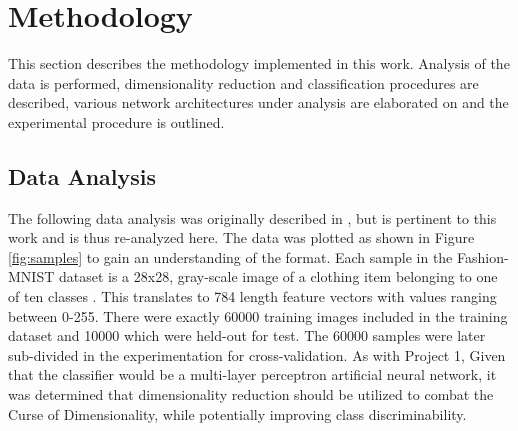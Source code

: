 \documentclass[conference]{IEEEtran}
\begin{document}
\section{Methodology} \label{Methodology}
	This section describes the methodology implemented in this work.  Analysis of the data is performed, dimensionality reduction  and classification procedures are described, various network architectures under analysis are elaborated on and the experimental procedure is outlined.

	\subsection{Data Analysis}
	 The following data analysis was originally described in \cite{McCurley2019PrincipeProject1}, but is pertinent to this work and is thus re-analyzed here.  The data was plotted as shown in Figure \ref{fig:samples} to gain an understanding of the format.  Each sample in the Fashion-MNIST dataset is a 28x28, gray-scale image of a clothing item belonging to one of ten classes \cite{Xiao2017FashionMNIST}. This translates to 784 length feature vectors with values ranging between 0-255. There were exactly 60000 training images included in the  training dataset and 10000 which were held-out for test.  The 60000 samples were later sub-divided in the experimentation for cross-validation.  As with Project 1,    Given that the classifier would be a multi-layer perceptron artificial neural network, it was determined that dimensionality reduction should be utilized to combat the Curse of Dimensionality, while potentially improving class discriminability.
	

	


	 
\end{document}
